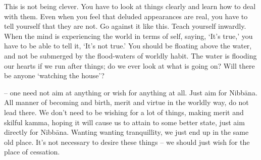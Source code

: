 This is not being clever. You have to look at things clearly and learn how to deal with them. Even when you feel that deluded appearances are real, you have to tell yourself that they are not. Go against it like this. Teach yourself inwardly. When the mind is experiencing the world in terms of self, saying, `It's true,' you have to be able to tell it, `It's not true.' You should be floating above the water, and not be submerged by the flood-waters of worldly habit. The water is flooding our hearts if we run after things; do we ever look at what is going on? Will there be anyone `watching the house'?

 -- one need not aim at anything or wish for anything at all. Just aim for Nibb\=ana. All manner of becoming and birth, merit and virtue in the worldly way, do not lead there. We don't need to be wishing for a lot of things, making merit and skilful kamma, hoping it will cause us to attain to some better state, just aim directly for Nibb\=ana. Wanting  wanting tranquillity, we just end up in the same old place. It's not necessary to desire these things -- we should just wish for the place of cessation. 

